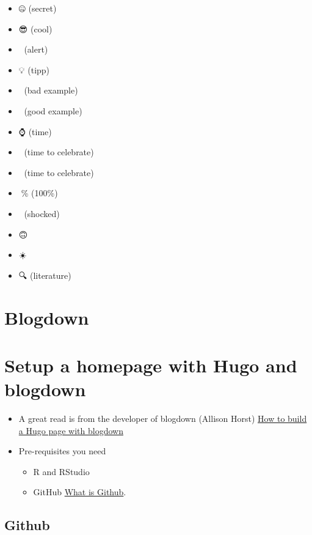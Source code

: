 \documentclass[
]{article}
\providecommand{\tightlist}{%
  \setlength{\itemsep}{0pt}\setlength{\parskip}{0pt}}
\begin{document}
\begin{itemize}
\tightlist
\item
  🤐 (secret)
\item
  😎 (cool)
\item
  🚨 (alert)
\item
  💡 (tipp)
\item
  💩 (bad example)
\item
  💪 (good example)
\item
  ⌚️ (time)
\item
  🍻 (time to celebrate)
\item
  🎉 (time to celebrate)
\item
  💯\% (100\%)
\item
  🤯 (shocked)
\item
  🙃
\item
  ☀️
\item
  🔍 (literature)
\end{itemize}

\hypertarget{blogdown}{%
\section{Blogdown}\label{blogdown}}

\hypertarget{setup-a-homepage-with-hugo-and-blogdown}{%
\section{Setup a homepage with Hugo and blogdown}\label{setup-a-homepage-with-hugo-and-blogdown}}

\begin{itemize}
\tightlist
\item
  A great read is from the developer of blogdown (Allison Horst) \href{https://alison.rbind.io/post/new-year-new-blogdown/\#pre-requisites}{How
  to build a Hugo page with
  blogdown}
\item
  Pre-requisites you need

  \begin{itemize}
  \tightlist
  \item
    R and RStudio
  \item
    GitHub \href{https://happygitwithr.com/}{What is Github}.
  \end{itemize}
\end{itemize}

\hypertarget{github-1}{%
\subsection{Github}\label{github-1}}
\end{document}

